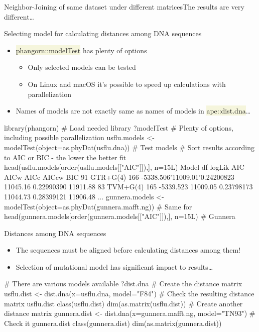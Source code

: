 \documentclass[compress, xelatex, 11pt, xcolor=svgnames, aspectratio=169,
	hyperref={
		bookmarks=true,
		unicode=true,
		colorlinks=true,
		pdftitle={Molecular data in R},
		plainpages=false,
		pdfauthor={Vojtech Zeisek},
		pdfsubject={Course about phylogeny and evolution in R},
		pdfcreator={XeLaTeX},
		pdfkeywords={R, evolution, phylogeny, molecular data},
		linkcolor=Crimson, %
		anchorcolor=Magenta, %
		citecolor=Magenta, %
		filecolor=Magenta, %
		menucolor=Magenta, %
		urlcolor=DodgerBlue, %
		},
	url={hyphens, lowtilde} %
	]{beamer}
\renewcommand{\texttt}[1]{\colorbox{Beige}{{\ttfamily #1}}}
\begin{document}
\begin{frame}{Neighbor-Joining of same dataset under different matrices}{The results are very different\ldots}
	\begin{center}
		\texttt{[image: distances.png]}
	\end{center}
\end{frame}

\begin{frame}[fragile]{Selecting model for calculating distances among DNA sequences}
	\begin{itemize}
		\item \texttt{phangorn::modelTest} has plenty of options
		\begin{itemize}
			\item Only selected models can be tested
			\item On Linux and macOS it's possible to speed up calculations with parallelization
		\end{itemize}
		\item Names of models are not exactly same as names of models in \texttt{ape::dist.dna}\ldots
	\end{itemize}
	\begin{spluscode}
    library(phangorn) # Load needed library
    ?modelTest # Plenty of options, including possible parallelization
    usflu.models <- modelTest(object=as.phyDat(usflu.dna)) # Test models
    # Sort results according to AIC or BIC - the lower the better fit
    head(usflu.models[order(usflu.models[["AIC"]]),], n=15L)
          Model  df    logLik      AIC       AICw     AICc      AICcw      BIC
    91 GTR+G(4) 166 -5338.506'11009.01'0.24200823 11045.16 0.22990390 11911.88
    83 TVM+G(4) 165 -5339.523 11009.05 0.23798173 11044.73 0.28399121 11906.48
    ...
    gunnera.models <- modelTest(object=as.phyDat(gunnera.mafft.ng)) # Same for
    head(gunnera.models[order(gunnera.models[["AIC"]]),], n=15L)    # Gunnera
	\end{spluscode}
\end{frame}

\begin{frame}[fragile]{Distances among DNA sequences}
	\begin{itemize}
		\item \alert{The sequences must be aligned before calculating distances among them!}
		\item Selection of mutational model has significant impact to results\ldots
	\end{itemize}
	\vfill
	\begin{spluscode}
    # There are various models available
    ?dist.dna
    # Create the distance matrix
    usflu.dist <- dist.dna(x=usflu.dna, model="F84")
    # Check the resulting distance matrix
    usflu.dist
    class(usflu.dist)
    dim(as.matrix(usflu.dist))
    # Create another distance matrix
    gunnera.dist <- dist.dna(x=gunnera.mafft.ng, model="TN93")
    # Check it
    gunnera.dist
    class(gunnera.dist)
    dim(as.matrix(gunnera.dist))
	\end{spluscode}
\end{frame}
\end{document}
